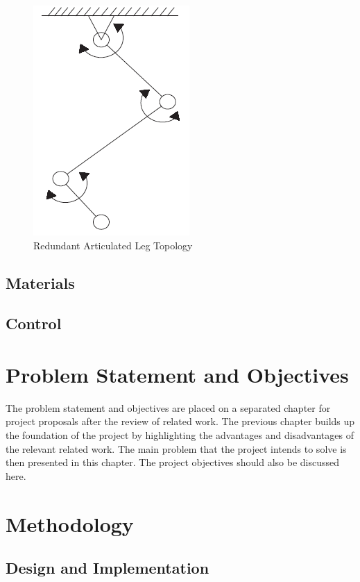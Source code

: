 \documentclass[english]{upeeei}
\begin{document}
\begin{figure}[H]
\begin{centering}
\includegraphics[width=0.3\columnwidth]{images/redundant_articulated_leg}
\par\end{centering}
\caption{Redundant Articulated Leg Topology\label{fig:redundant-articulated-leg}}
\end{figure}

\section{Materials}
\section{Control}

\cleardoublepage{}

\chapter{Problem Statement and Objectives \label{cha:ProbStatement}}

The problem statement and objectives are placed on a separated chapter
for project proposals after the review of related work. The previous
chapter builds up the foundation of the project by highlighting the
advantages and disadvantages of the relevant related work. The main
problem that the project intends to solve is then presented in this
chapter. The project objectives should also be discussed here.

\cleardoublepage{}

\chapter{Methodology\label{cha:Methodology}}

\section{Design and Implementation}
\end{document}

